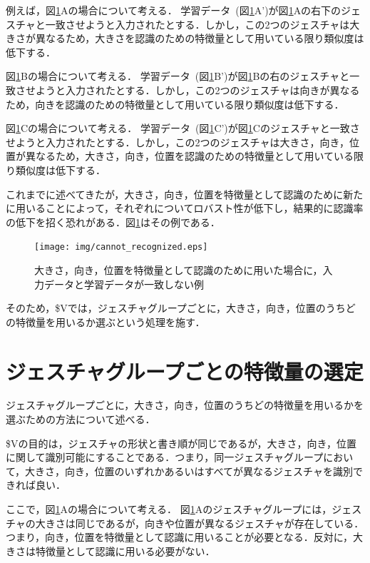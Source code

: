 例えば，図\ref{fig:cannot_recognized}Aの場合について考える．
学習データ~(図\ref{fig:cannot_recognized}A')が図\ref{fig:cannot_recognized}Aの右下のジェスチャと一致させようと入力されたとする．しかし，この2つのジェスチャは大きさが異なるため，大きさを認識のための特徴量として用いている限り類似度は低下する．

図\ref{fig:cannot_recognized}Bの場合について考える．
学習データ~(図\ref{fig:cannot_recognized}B')が図\ref{fig:cannot_recognized}Bの右のジェスチャと一致させようと入力されたとする．しかし，この2つのジェスチャは向きが異なるため，向きを認識のための特徴量として用いている限り類似度は低下する．

図\ref{fig:cannot_recognized}Cの場合について考える．
学習データ~(図\ref{fig:cannot_recognized}C')が図\ref{fig:cannot_recognized}Cのジェスチャと一致させようと入力されたとする．しかし，この2つのジェスチャは大きさ，向き，位置が異なるため，大きさ，向き，位置を認識のための特徴量として用いている限り類似度は低下する．

これまでに述べてきたが，大きさ，向き，位置を特徴量として認識のために新たに用いることによって，それぞれについてロバスト性が低下し，結果的に認識率の低下を招く恐れがある．図\ref{fig:cannot_recognized}はその例である．

\begin{figure} [h!]
	\begin{center}
		\texttt{[image: img/cannot\_recognized.eps]}
	\end{center}
	\caption{大きさ，向き，位置を特徴量として認識のために用いた場合に，入力データと学習データが一致しない例}
	\label{fig:cannot_recognized}
\end{figure}

そのため，\$Vでは，ジェスチャグループごとに，大きさ，向き，位置のうちどの特徴量を用いるか選ぶという処理を施す．

\section{ジェスチャグループごとの特徴量の選定}
ジェスチャグループごとに，大きさ，向き，位置のうちどの特徴量を用いるかを選ぶための方法について述べる．

\$Vの目的は，ジェスチャの形状と書き順が同じであるが，大きさ，向き，位置に関して識別可能にすることである．つまり，同一ジェスチャグループにおいて，大きさ，向き，位置のいずれかあるいはすべてが異なるジェスチャを識別できれば良い．

ここで，図\ref{fig:cannot_recognized}Aの場合について考える．
図\ref{fig:cannot_recognized}Aのジェスチャグループには，ジェスチャの大きさは同じであるが，向きや位置が異なるジェスチャが存在している．つまり，向き，位置を特徴量として認識に用いることが必要となる．反対に，大きさは特徴量として認識に用いる必要がない．

